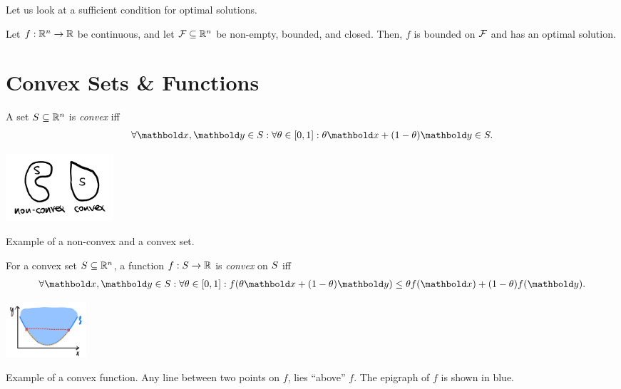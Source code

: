 Let us look at a sufficient condition for optimal solutions. \begin{thm}
Let $f : \mathbb{R}^n \to \mathbb{R}$ be continuous, and let $\mathcal{F} \subseteq \mathbb{R}^n$ be non-empty, bounded, and closed. Then, $f$ is bounded on $\mathcal{F}$ and has an optimal solution.
\end{thm}

\section{Convex Sets \& Functions}

\begin{defn} A set $S \subseteq \mathbb{R}^n$ is \emph{convex} iff \begin{align}
    \forall \vx, \vy \in \sS: \forall \theta \in [0,1]: \theta\vx + (1-\theta)\vy \in \sS.
\end{align}
\end{defn}
\begin{marginfigure}
\centering\includegraphics[width=4cm]{notes/figures/convex_set.png}
\caption{Example of a non-convex and a convex set.}
\end{marginfigure}
\begin{defn} For a convex set $S \subseteq \mathbb{R}^n$, a function $f : S \to \mathbb{R}$ is \emph{convex} on $S$ iff \begin{align}
    \forall \vx, \vy \in \sS: \forall \theta \in [0,1]: f(\theta\vx + (1-\theta)\vy) \leq \theta f(\vx) + (1-\theta) f(\vy).
\end{align}
\end{defn}
\begin{marginfigure}
\centering\includegraphics[width=3cm]{notes/figures/convex_function.png}
\caption{Example of a convex function. Any line between two points on $f$, lies ``above'' $f$. The epigraph of $f$ is shown in blue.}
\end{marginfigure}

